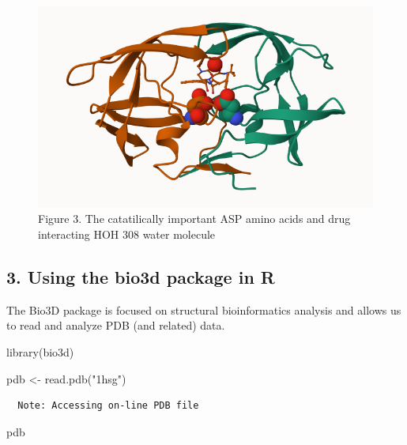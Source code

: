 \documentclass[
  letterpaper,
  DIV=11,
  numbers=noendperiod]{scrartcl}
\newenvironment{Shaded}{\begin{snugshade}}{\end{snugshade}}
\newcommand{\FunctionTok}[1]{\textcolor[rgb]{0.28,0.35,0.67}{#1}}
\newcommand{\NormalTok}[1]{\textcolor[rgb]{0.00,0.23,0.31}{#1}}
\newcommand{\OtherTok}[1]{\textcolor[rgb]{0.00,0.23,0.31}{#1}}
\newcommand{\StringTok}[1]{\textcolor[rgb]{0.13,0.47,0.30}{#1}}
\begin{document}
\begin{figure}[H]

{\centering \includegraphics{1HSG2.png}

}

\caption{Figure 3. The catatilically important ASP amino acids and drug
interacting HOH 308 water molecule}

\end{figure}%

\subsection{3. Using the bio3d package in
R}\label{using-the-bio3d-package-in-r}

The Bio3D package is focused on structural bioinformatics analysis and
allows us to read and analyze PDB (and related) data.

\begin{Shaded}
\begin{Highlighting}[]
\FunctionTok{library}\NormalTok{(bio3d)}
\end{Highlighting}
\end{Shaded}

\begin{Shaded}
\begin{Highlighting}[]
\NormalTok{pdb }\OtherTok{\textless{}{-}} \FunctionTok{read.pdb}\NormalTok{(}\StringTok{"1hsg"}\NormalTok{)}
\end{Highlighting}
\end{Shaded}

\begin{verbatim}
  Note: Accessing on-line PDB file
\end{verbatim}

\begin{Shaded}
\begin{Highlighting}[]
\NormalTok{pdb}
\end{Highlighting}
\end{Shaded}
\end{document}
